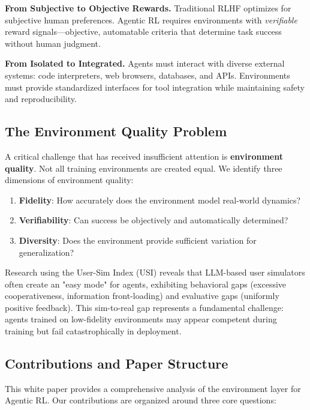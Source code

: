 \textbf{From Subjective to Objective Rewards.} Traditional RLHF optimizes for subjective human preferences. Agentic RL requires environments with \textit{verifiable} reward signals---objective, automatable criteria that determine task success without human judgment.

\textbf{From Isolated to Integrated.} Agents must interact with diverse external systems: code interpreters, web browsers, databases, and APIs. Environments must provide standardized interfaces for tool integration while maintaining safety and reproducibility.

\subsection{The Environment Quality Problem}

A critical challenge that has received insufficient attention is \textbf{environment quality}. Not all training environments are created equal. We identify three dimensions of environment quality:

\begin{enumerate}
    \item \textbf{Fidelity}: How accurately does the environment model real-world dynamics?
    \item \textbf{Verifiability}: Can success be objectively and automatically determined?
    \item \textbf{Diversity}: Does the environment provide sufficient variation for generalization?
\end{enumerate}

Research using the User-Sim Index (USI) reveals that LLM-based user simulators often create an "easy mode" for agents, exhibiting behavioral gaps (excessive cooperativeness, information front-loading) and evaluative gaps (uniformly positive feedback). This sim-to-real gap represents a fundamental challenge: agents trained on low-fidelity environments may appear competent during training but fail catastrophically in deployment.

\subsection{Contributions and Paper Structure}

This white paper provides a comprehensive analysis of the environment layer for Agentic RL. Our contributions are organized around three core questions:

